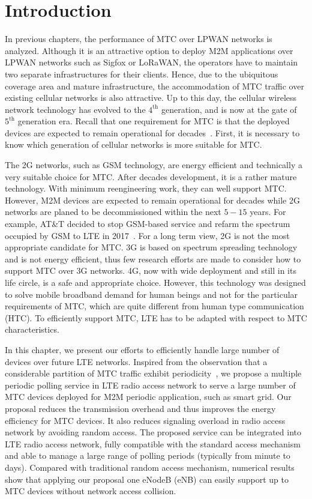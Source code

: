 \section{Introduction}
\label{sec:introduction}
In previous chapters, the performance of MTC over LPWAN networks is analyzed. Although it is an attractive option to deploy M2M applications over LPWAN networks such as Sigfox or LoRaWAN, the operators have to maintain two separate infrastructures for their clients. Hence, due to the ubiquitous coverage area and mature infrastructure, the accommodation of MTC traffic over existing cellular networks is also attractive. 
Up to this day, the cellular wireless network technology has evolved to the $4^{\text{th}}$ generation, and is now at the gate of $5^{\text{th}}$ generation era. Recall that one requirement for MTC is that the deployed devices are expected to remain operational for decades~\cite{GrowthInM2M2011}. First, it is necessary to know which generation of cellular networks is more suitable for MTC.

The 2G networks, such as GSM technology, are energy efficient and technically a very suitable choice for MTC. After decades development, it is a rather mature technology. With minimum reengineering work, they can well support MTC. However, M2M devices are expected to remain operational for decades while 2G networks are planed to be decommissioned within the next $5-15$ years. For example, AT\&T decided to stop GSM-based service and refarm the spectrum occupied by GSM to LTE in 2017~\cite{att2014}. For a long term view, 2G is not the most appropriate candidate for MTC. 3G is based on spectrum spreading technology and is not energy efficient, thus few research efforts are made to consider how to support MTC over 3G networks. 4G, now with wide deployment and still in its life circle, is a safe and appropriate choice. However, this technology was designed to solve mobile broadband demand for human beings and not for the particular requirements of MTC, which are quite different from human type communication (HTC). To efficiently support MTC, LTE has to be adapted with respect to MTC characteristics. 

In this chapter, we present our efforts to efficiently handle large number of devices over future LTE networks. Inspired from the observation that a considerable partition of MTC traffic exhibit periodicity~\cite{Costa14}, we propose a multiple periodic polling service in LTE radio access network to serve a large number of MTC devices deployed for M2M periodic application, such as smart grid. Our proposal reduces the transmission overhead and thus improves the energy efficiency for MTC devices. It also reduces signaling overload in radio access network by avoiding random access.  
The proposed service can be integrated into LTE radio access network, fully compatible with the standard access mechanism and able to manage a large range of polling periods (typically from  minute to  days). Compared with traditional random access mechanism, numerical results show that applying our proposal one eNodeB (eNB) can easily support up to  MTC devices without network access collision.  

